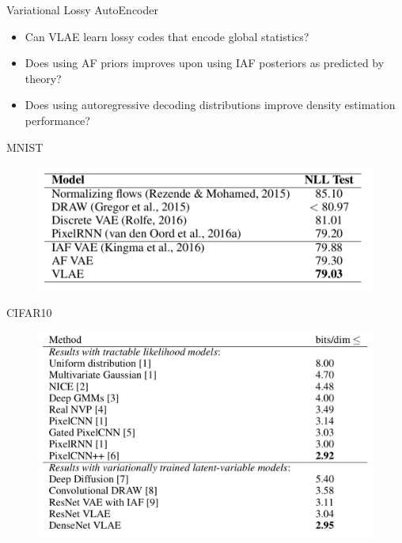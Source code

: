 \begin{frame}{Variational Lossy AutoEncoder}
	\begin{itemize}
		\item Can VLAE learn lossy codes that encode global statistics?
		\item Does using AF priors improves upon using IAF posteriors as predicted by theory?
		\item Does using autoregressive decoding distributions improve density estimation performance?
	\end{itemize}
	\begin{minipage}[t]{0.5\columnwidth}
		\vspace{1cm}
		MNIST
		\begin{figure}[h]
			\centering
			\includegraphics[width=1.\linewidth]{figs/VLAE_1.png}
		\end{figure}
	\end{minipage}%
	\begin{minipage}[t]{0.5\columnwidth}
		CIFAR10
		\begin{figure}[h]
			\centering
			\includegraphics[width=1.\linewidth]{figs/VLAE_2.png}
		\end{figure}
	\end{minipage}
	
\end{frame}
